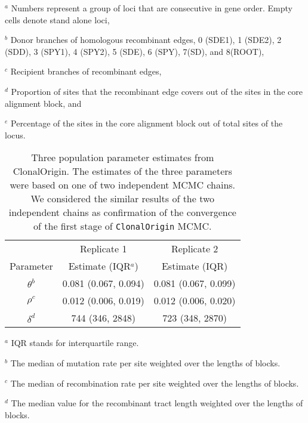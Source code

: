 \documentclass[english]{article}
\providecommand{\tabularnewline}{\\}
\begin{document}
\begin{table}
{$^a$ Numbers represent a group of loci that are consecutive in gene order. Empty
cells denote stand alone loci,

$^b$ Donor branches of homologous recombinant edges, 0 (SDE1), 1 (SDE2), 2
(SDD), 3 (SPY1), 4 (SPY2), 5 (SDE), 6 (SPY), 7(SD), and 8(ROOT),

$^c$ Recipient branches of recombinant edges,

$^d$ Proportion of sites that the recombinant edge covers out of the sites in
the core alignment block, and

$^e$ Percentage of the sites in the core alignment block out of total sites of
the locus.
}

\end{table}
\clearpage{}



\begin{table}
\caption{\label{tab:three}Three population parameter estimates from
ClonalOrigin. 
The estimates of the three parameters were based on one of two independent
MCMC chains.  We considered the similar 
results of the two independent chains as confirmation of 
the convergence of the first stage of \texttt{ClonalOrigin} MCMC.
}
\noindent \begin{centering}
\begin{tabular}{ccc}
& Replicate 1 & Replicate 2\tabularnewline
Parameter & Estimate (IQR$^a$) & Estimate (IQR)\tabularnewline
\hline
$\theta^b$ & 0.081 (0.067, 0.094) & 0.081 (0.067, 0.099)\tabularnewline
$\rho^c$ & 0.012 (0.006, 0.019) & 0.012 (0.006, 0.020)\tabularnewline
$\delta^d$ & 744 (346, 2848) & 723 (348, 2870)\tabularnewline
\hline
\end{tabular}
\par\end{centering}

$^a$ IQR stands for interquartile range.

$^b$ The median of mutation rate per site weighted over the lengths of blocks. 

$^c$ The median of recombination rate per site weighted over the lengths of blocks.

$^d$ The median value for the recombinant tract length weighted over the lengths of blocks.

\end{table}
\clearpage{}
\end{document}
